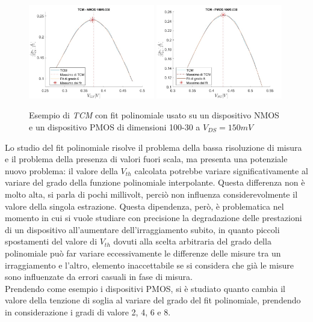 \documentclass[12pt, letterpaper]{book}
\begin{document}
\begin{figure}[H]
  \centering
  \includegraphics[width=0.49\textwidth]{TCM-N4-100-30}
  \includegraphics[width=0.49\textwidth]{TCM-P1-100-30}
  \caption{Esempio di \emph{TCM} con fit polinomiale usato su un dispositivo NMOS e un dispositivo PMOS di dimensioni 100-30 a $V_{DS} = 150 mV$}
\end{figure}

Lo 
studio del fit polinomiale risolve il problema della bassa risoluzione di misura e il problema della presenza di valori fuori scala, ma presenta una potenziale nuovo problema: il valore della $V_{th}$ calcolata potrebbe variare significativamente al variare del grado della funzione polinomiale interpolante. Questa differenza non è molto alta, si parla di pochi millivolt, perciò non influenza considerevolmente il valore della singola estrazione. Questa dipendenza, però, è problematica nel momento in cui si vuole studiare con precisione la degradazione delle prestazioni di un dispositivo all'aumentare dell'irraggiamento subito, in quanto piccoli spostamenti del valore di $V_{th}$ dovuti alla scelta arbitraria del grado della polinomiale può far variare eccessivamente le differenze delle misure tra un irraggiamento e l'altro, elemento inaccettabile se si considera che già le misure sono influenzate da errori casuali in fase di misura.\\
Prendendo come esempio i dispositivi PMOS, si è studiato quanto cambia il valore della tenzione di soglia al variare del grado del fit polinomiale, prendendo in considerazione i gradi di valore 2, 4, 6 e 8.\\
\end{document}
